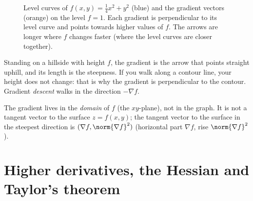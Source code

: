 \begin{figure}[ht]
\centering
{}
\caption{Level curves of $f(x,y)=\frac14x^2+y^2$ (blue) and the gradient vectors (orange) on the level $f=1$. Each gradient is perpendicular to its level curve and points towards higher values of $f$. The arrows are longer where $f$ changes faster (where the level curves are closer together).}
\label{fig:gradient}
\end{figure}

\begin{intuition}
Standing on a hillside with height $f$, the gradient is the arrow that points straight uphill, and its length is the steepness. If you walk along a contour line, your height does not change: that is why the gradient is perpendicular to the contour. Gradient \emph{descent} walks in the direction $-\nabla f$.
\end{intuition}

\begin{pitfall}
The gradient lives in the \emph{domain} of $f$ (the $xy$-plane), not in the graph. It is not a tangent vector to the surface $z=f(x,y)$; the tangent vector to the surface in the steepest direction is $(\nabla f,\norm{\nabla f}^2)$ (horizontal part $\nabla f$, rise $\norm{\nabla f}^2$).
\end{pitfall}

\section{Higher derivatives, the Hessian and Taylor's theorem}

